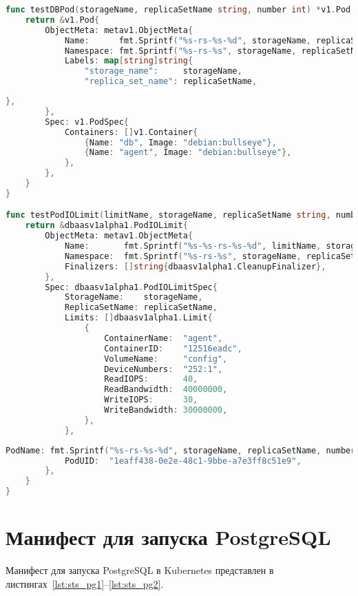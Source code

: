 \begin{appendices}
\begin{lstlisting}[language=Go,label=lst:int6, caption={Интеграционный тест (продолжение листинга~\ref{lst:int5})}]
func testDBPod(storageName, replicaSetName string, number int) *v1.Pod {
	return &v1.Pod{
		ObjectMeta: metav1.ObjectMeta{
			Name:      fmt.Sprintf("%s-rs-%s-%d", storageName, replicaSetName, number),
			Namespace: fmt.Sprintf("%s-rs-%s", storageName, replicaSetName),
			Labels: map[string]string{
				"storage_name":     storageName,
				"replica_set_name": replicaSetName,
\end{lstlisting}

\begin{lstlisting}[language=Go,label=lst:int7, caption={Интеграционный тест (продолжение листинга~\ref{lst:int6})}]
			},
		},
		Spec: v1.PodSpec{
			Containers: []v1.Container{
				{Name: "db", Image: "debian:bullseye"},
				{Name: "agent", Image: "debian:bullseye"},
			},
		},
	}
}

func testPodIOLimit(limitName, storageName, replicaSetName string, number int) *dbaasv1alpha1.PodIOLimit {
	return &dbaasv1alpha1.PodIOLimit{
		ObjectMeta: metav1.ObjectMeta{
			Name:       fmt.Sprintf("%s-%s-rs-%s-%d", limitName, storageName, replicaSetName, number),
			Namespace:  fmt.Sprintf("%s-rs-%s", storageName, replicaSetName),
			Finalizers: []string{dbaasv1alpha1.CleanupFinalizer},
		},
		Spec: dbaasv1alpha1.PodIOLimitSpec{
			StorageName:    storageName,
			ReplicaSetName: replicaSetName,
			Limits: []dbaasv1alpha1.Limit{
				{
					ContainerName:  "agent",
					ContainerID:    "12516eadc",
					VolumeName:     "config",
					DeviceNumbers:  "252:1",
					ReadIOPS:       40,
					ReadBandwidth:  40000000,
					WriteIOPS:      30,
					WriteBandwidth: 30000000,
				},
			},
\end{lstlisting}

\begin{lstlisting}[language=Go,label=lst:int8, caption={Интеграционный тест (продолжение листинга~\ref{lst:int7})}]
			PodName: fmt.Sprintf("%s-rs-%s-%d", storageName, replicaSetName, number),
			PodUID:  "1eaff438-0e2e-48c1-9bbe-a7e3ff8c51e9",
		},
	}
}
\end{lstlisting}


	\chapter{Манифест для запуска PostgreSQL}
	
Манифест для запуска PostgreSQL в Kubernetes представлен в листингах~\ref{lst:sts_pg1}--\ref{lst:sts_pg2}.


\end{appendices}
